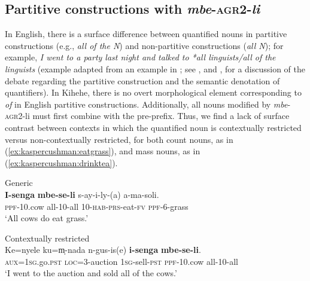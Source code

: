 \documentclass[output=paper,modfonts,nonflat]{langsci/langscibook}
\begin{document}
\subsection{Partitive constructions with \emph{mbe}-\textsc{agr2}-\emph{li}}

In English, there is a surface difference between quantified nouns in partitive constructions (e.g., \textit{all of the N}) and non-partitive constructions (\textit{all N}); for example, \textit{I went to a party last night and talked to *all linguists/all of the linguists} (example adapted from an example in \citealt[170]{Matthewson2001}; see \citealt{Matthewson2001}, and \citealt{Matthewson2013}, for a discussion of the debate regarding the partitive construction and the semantic denotation of quantifiers). In Kihehe, there is no overt morphological element corresponding to \textit{of} in English partitive constructions. Additionally, all nouns modified by \emph{mbe}-\textsc{agr2}-{li} must first combine with the pre-prefix.  Thus, we find a lack of surface contrast between contexts in which the quantified noun is contextually restricted versus non-contextually restricted, for both count nouns, as in (\ref{ex:kaspercushman:eatgrass}), and mass nouns, as in (\ref{ex:kaspercushman:drinktea}).

\begin{exe} 

\ex \label{ex:kaspercushman:partitive} \begin{xlist} \label{ex:kaspercushman:eatgrass}

\ex Generic\\
\gll \textbf{I-senga} \textbf{mbe-se-li} s-ay-i-ly-(a) a-ma-soli. \\
\textsc{ppf}-10.cow all-10-all 10-\textsc{hab}-\textsc{prs}-eat-\textsc{fv} \textsc{ppf}-6-grass \\
\glt `All cows do eat grass.'

\ex  Contextually restricted\\
\gll Ke=nyele ku=m̩-nada n-gus-is(e) \textbf{i-senga} \textbf{mbe-se-li}. \\
\textsc{aux}=\textsc{1sg}.go.\textsc{pst} \textsc{loc}=3-auction \textsc{1sg}-sell-\textsc{pst} \textsc{ppf}-10.cow all-10-all \\
\glt `I went to the auction and sold all of the cows.'
\end{xlist}
\end{exe}
\end{document}

